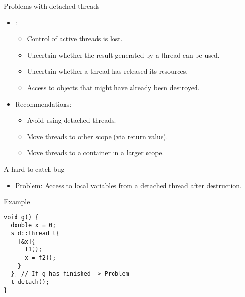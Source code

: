 \begin{frame}[t,fragile]{Problems with detached threads}
\begin{itemize}
  \item {}:
    \begin{itemize}
      \item Control of active threads is lost.
      \item Uncertain whether the result generated by a thread can be used.
      \item Uncertain whether a thread has released its resources.
      \item Access to objects that might have already been destroyed.
    \end{itemize}
  \vfill
  \item Recommendations:
    \begin{itemize}
      \item Avoid using detached threads.
      \item Move threads to other scope (via return value).
      \item Move threads to a container in a larger scope.
    \end{itemize}
\end{itemize}
\end{frame}

\begin{frame}[t,fragile]{A hard to catch bug}
\begin{itemize}
  \item \alert{Problem}: 
        Access to local variables from a detached thread after destruction.
\end{itemize}
\begin{block}{Example}
\begin{lstlisting}
void g() {
  double x = 0;
  std::thread t{
    [&x]{ 
      f1(); 
      x = f2();
    }
  }; // If g has finished -> Problem
  t.detach();
}
\end{lstlisting}
\end{block}
\end{frame}

